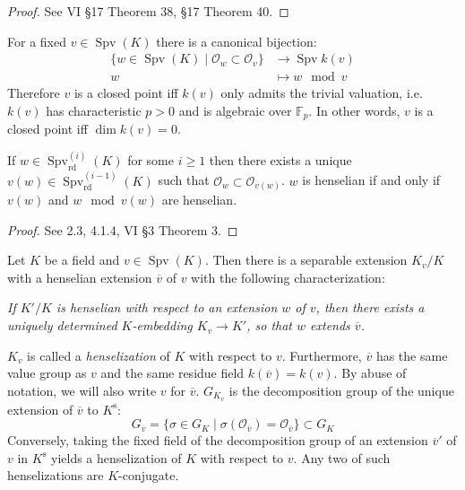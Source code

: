 \begin{proof}
See \cite{ZS60} VI §17 Theorem 38, §17 Theorem 40.
\end{proof}

\begin{lemma}\label{2.2-pre}
For a fixed $v\in \operatorname{Spv}(K)$ there is a canonical bijection: 
\begin{align*}
\{ w\in\operatorname{Spv}(K)\mid \mathcal{O}_w\subset\mathcal{O}_v \} &\longrightarrow \operatorname{Spv}k(v)\\ 
w&\longmapsto w\mod v
\end{align*}
Therefore $v$ is a closed point iff $k(v)$ only admits the trivial valuation, i.e. $k(v)$ has characteristic $p>0$ and is algebraic over $\mathbb{F}_p$. In other words, $v$ is a closed point iff $\dim k(v)=0$.

If $w\in\operatorname{Spv}_\text{rd}^{(i)}(K)$ for some $i\geq 1$ then there exists a unique $v(w)\in\operatorname{Spv}_\text{rd}^{(i-1)}(K)$ such that $\mathcal{O}_w\subset\mathcal{O}_{v(w)}$. $w$ is henselian if and only if $v(w)$ and $w\mod v(w)$ are henselian.
\end{lemma}

\begin{proof}
See \cite{EP05} 2.3, 4.1.4, \cite{ZS60} VI §3 Theorem 3.
\end{proof}

\begin{theorem}\label{theorem-henselization}
Let $K$ be a field and $v\in\operatorname{Spv}(K)$. Then there is a separable extension $K_v/K$ with a henselian extension $\overline{v}$ of $v$ with the following characterization:

\textit{If $K'/K$ is henselian with respect to an extension $w$ of $v$, then there exists a uniquely determined $K$-embedding $K_v\to K'$, so that $w$ extends $\overline{v}$.}

$K_v$ is called a \textit{henselization} of $K$ with respect to $v$. Furthermore, $\overline{v}$ has the same value group as $v$ and the same residue field $k(\overline{v}) = k(v)$. By abuse of notation, we will also write $v$ for $\overline{v}$. $G_{K_v}$ is the decomposition group of the unique extension of $\overline{v}$ to $K^\text{s}$:
\[ G_{\overline{v}} = \{ \sigma\in G_K\mid \sigma(\mathcal{O}_{\overline{v}}) =\mathcal{O}_{\overline{v}} \} \subset G_K \]
Conversely, taking the fixed field of the decomposition group of an extension $\overline{v}'$ of $v$ in $K^\text{s}$ yields a henselization of $K$ with respect to $v$. Any two of such henselizations are $K$-conjugate.
\end{theorem}

